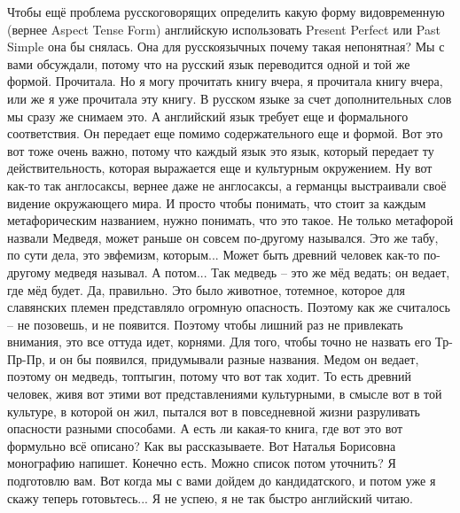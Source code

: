 \documentclass[main.tex]{subfiles}
\begin{document}
Чтобы ещё проблема русскоговорящих определить какую форму видовременную (вернее Aspect Tense Form) английскую использовать Present Perfect или Past Simple она бы снялась.
Она для русскоязычных почему такая непонятная?
Мы с вами обсуждали, потому что на русский язык переводится одной и той же формой.
Прочитала.
Но я могу прочитать книгу вчера, я прочитала книгу вчера, или же я уже прочитала эту книгу.
В русском языке за счет дополнительных слов мы сразу же снимаем это.
А английский язык требует еще и формального соответствия.
Он передает еще помимо содержательного еще и формой.
Вот это вот тоже очень важно, потому что каждый язык это язык, который передает ту действительность, которая выражается еще и культурным окружением.
Ну вот как-то так англосаксы, вернее даже не англосаксы, а германцы выстраивали своё видение окружающего мира.
И просто чтобы понимать, что стоит за каждым метафорическим названием, нужно понимать, что это такое.
Не только метафорой назвали Медведя, может раньше он совсем по-другому назывался.
Это же табу, по сути дела, это эвфемизм, которым...
Может быть древний человек как-то по-другому медведя называл.
А потом...
Так медведь -- это же мёд ведать; он ведает, где мёд будет.
Да, правильно.
Это было животное, тотемное, которое для славянских племен представляло огромную опасность.
Поэтому как же считалось -- не позовешь, и не появится.
Поэтому чтобы лишний раз не привлекать внимания, это все оттуда идет, корнями.
Для того, чтобы точно не назвать его Тр-Пр-Пр, и он бы появился, придумывали разные названия.
Медом он ведает, поэтому он медведь, топтыгин, потому что вот так ходит.
То есть древний человек, живя вот этими вот представлениями культурными, в смысле вот в той культуре, в которой он жил, пытался вот в повседневной жизни разруливать опасности разными способами.
А есть ли какая-то книга, где вот это вот формульно всё описано? Как вы рассказываете.
Вот Наталья Борисовна монографию напишет.
Конечно есть.
Можно список потом уточнить?
Я подготовлю вам.
Вот когда мы с вами дойдем до кандидатского, и потом уже я скажу теперь готовьтесь...
Я не успею, я не так быстро английский читаю.
\end{document}
